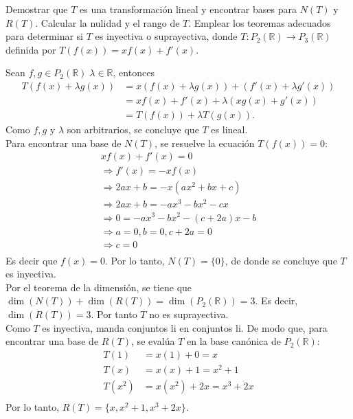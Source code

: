 \documentclass[11pt]{article}
\numberwithin{equation}{section}
\newcommand{\R}{\mathbb{R}}
\begin{document}
	\makeatletter
        \renewenvironment{proof}[1][\proofname]{\par
            \pushQED{\qed}%
            \normalfont \topsep6\p@\@plus6\p@\relax
            \trivlist
            \item\relax
            {\itshape
            #1\@addpunct{.}}\par\vspace{\baselineskip}\ignorespaces
            }{%
            \popQED\endtrivlist\@endpefalse
            }
    \makeatother
    
\begin{Problema}{} Demostrar que $T$ es una transformación lineal y encontrar bases para $N(T)$ y $R(T)$. Calcular la nulidad y el rango de $T$. 
    Emplear los teoremas adecuados para determinar si $T$ es inyectiva o suprayectiva, 
    donde $T: P_2(\R) \to P_3(\R)$ definida por $T(f(x)) = x f(x) + f'(x)$.
\end{Problema}
\begin{proof}
    Sean $f, g \in P_2(\R)\;\lambda \in \R$, entonces 
    \begin{align*}
        T(f(x) + \lambda g(x)) &= x(f(x) + \lambda g(x)) + (f'(x) + \lambda g'(x)) \\
         &=x f(x) + f'(x) + \lambda(x g(x) + g'(x)) \\
         &= T(f(x)) + \lambda T(g(x)).
    \end{align*}
    Como $f,g$ y $\lambda$ son arbitrarios, se concluye que $T$ es lineal.\\
    Para encontrar una base de $N(T)$, se resuelve la ecuación $T(f(x)) = 0$:
    \begin{align*}
        xf(x)+f'(x)=0 \\
        \Rightarrow f'(x) = -xf(x) \\
        \Rightarrow 2ax+b=-x(ax^2+bx+c)\\
        \Rightarrow 2ax+b=-ax^3-bx^2-cx\\
        \Rightarrow 0=-ax^3-bx^2-(c+2a)x-b\\
        \Rightarrow a=0, b=0, c+2a=0\\
        \Rightarrow c=0\\
    \end{align*}
    Es decir que $f(x)=0$. Por lo tanto, $N(T)=\{0\}$, de donde se concluye que $T$ es inyectiva.\\
    Por el teorema de la dimensión, se tiene que $\dim(N(T))+\dim(R(T))=\dim(P_2(\R))=3$. Es decir, $\dim(R(T))=3$. Por tanto $T$ no es suprayectiva.\\
    Como $T$ es inyectiva, manda conjuntos li en conjuntos li. De modo que, para encontrar una base de $R(T)$, 
    se evalúa $T$ en la base canónica de $P_2(\R)$:
    \begin{align}
        T(1) &= x(1)+0= x \\
        T(x) &= x(x)+1= x^2+1 \\
        T(x^2) &= x(x^2)+2x= x^3+2x \\
    \end{align}
    Por lo tanto, $R(T)=\{x,x^2+1,x^3+2x\}$.\\
\end{proof}
\end{document}

